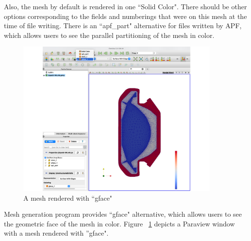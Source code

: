 Also, the mesh by default is rendered in one ``Solid Color".
There should be other options corresponding to the fields and numberings
that were on this mesh at the time of file writing.
There is an ``apf\_part" alternative for files written by APF, which
allows users to see the parallel partitioning of the mesh in color.

\begin{figure}
\centering
\includegraphics[width=4in]{./figures/paraview-fig5.pdf}
\caption{A mesh rendered with ``gface"}
\label{fig:paraview-5}
\end{figure}

Mesh generation program provides ``gface" alternative, which
allows users to see the geometric face of the mesh in color. 
Figure ~\ref{fig:paraview-5} depicts a Paraview window with a mesh rendered with ''gface".
